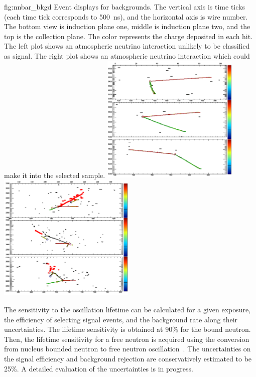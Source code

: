 \begin{dunefigure}
{fig:nnbar_bkgd}
{Event displays for \nnbar backgrounds.  The vertical axis is time ticks (each time tick corresponds to \SI{500}{\ns}), and the horizontal axis is wire number.  The bottom view is induction plane one, middle is induction plane two, and the top is the collection plane.  The color represents the charge deposited in each hit.  The left plot shows an atmospheric neutrino interaction unlikely to be classified as signal. The right plot shows an atmospheric neutrino interaction which could make it into the selected sample.}
\includegraphics[width=0.49\textwidth]{graphics/nnbar_bkgd_ev2.png}
\includegraphics[width=0.49\textwidth]{graphics/nnbar_bkgd_ev1.png}
\end{dunefigure} 

The sensitivity to the \nnbar oscillation lifetime can be calculated for a given exposure, the efficiency of selecting signal events, and the background rate along their uncertainties. The lifetime sensitivity is obtained at \num{90}\%  for the bound neutron. Then, the lifetime sensitivity for a free neutron is acquired using the conversion from nucleus bounded neutron to free neutron \nnbar oscillation~\cite{Friedman:2008es}.  
The uncertainties on the signal efficiency and background rejection are conservatively estimated to be \num{25}\%.  A detailed evaluation of the uncertainties is in progress.

